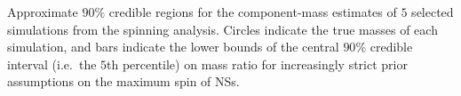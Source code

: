 \label{fig:comp_masses} Approximate $90\%$ credible regions for the component-mass estimates of $5$ selected simulations from the spinning analysis.  Circles indicate the true masses of each simulation, and bars indicate the lower bounds of the central $90\%$ credible interval (i.e.\ the $5$th percentile) on mass ratio for increasingly strict prior assumptions on the maximum spin of NSs.
  
  
  
  
  
  
  